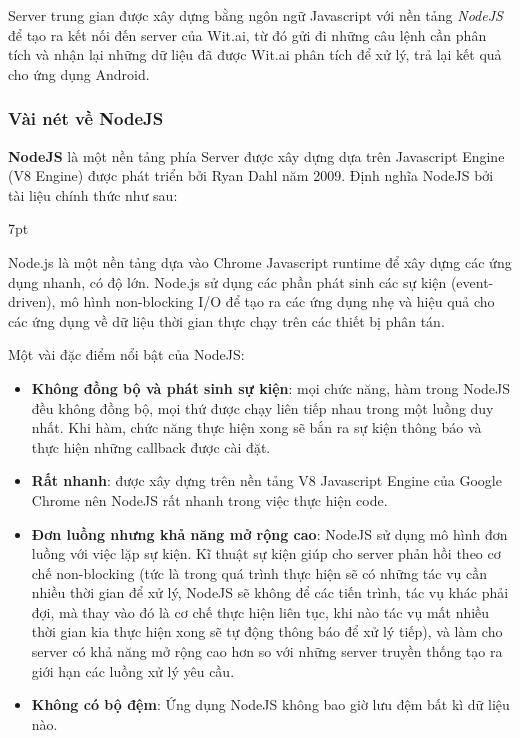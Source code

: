 \documentclass[12pt]{report}
\newenvironment{formal}{%
  \def\FrameCommand{%
    \hspace{1pt}%
    {\color{mygray}\vrule width 6pt}%
    {\color{lightgray}\vrule width 4pt}%
    \colorbox{lightgray}%
  }%
  \MakeFramed{\advance\hsize-\width\FrameRestore}%
  \noindent\hspace{-4.55pt}%
  \begin{adjustwidth}{}{7pt}%
  \vspace{2pt}\vspace{2pt}%
}
{%
  \vspace{2pt}\end{adjustwidth}\endMakeFramed%
}
\begin{document}
Server trung gian được xây dựng bằng ngôn ngữ Javascript với nền tảng \textit{NodeJS} để tạo ra kết nối đến server của Wit.ai, từ đó gửi đi những câu lệnh cần phân tích và nhận lại những dữ liệu đã được Wit.ai phân tích để xử lý, trả lại kết quả cho ứng dụng Android.

\subsubsection{Vài nét về NodeJS}

\textbf{NodeJS} là một nền tảng phía Server được xây dựng dựa trên Javascript Engine (V8 Engine) được phát triển bởi Ryan Dahl năm 2009. Định nghĩa NodeJS bởi tài liệu chính thức như sau:

\begin{formal}
Node.js là một nền tảng dựa vào Chrome Javascript runtime để xây dựng các ứng dụng nhanh, có độ lớn. Node.js sử dụng các phần phát sinh các sự kiện (event-driven), mô hình non-blocking I/O để tạo ra các ứng dụng nhẹ và hiệu quả cho các ứng dụng về dữ liệu thời gian thực chạy trên các thiết bị phân tán.
\end{formal}

Một vài đặc điểm nổi bật của NodeJS:

\begin{itemize}
	\item \textbf{Không đồng bộ và phát sinh sự kiện}: mọi chức năng, hàm trong NodeJS đều không đồng bộ, mọi thứ được chạy liên tiếp nhau trong một luồng duy nhất. Khi hàm, chức năng thực hiện xong sẽ bắn ra sự kiện thông báo và thực hiện những callback được cài đặt.
	\item \textbf{Rất nhanh}: được xây dựng trên nền tảng V8 Javascript Engine của Google Chrome nên NodeJS rất nhanh trong việc thực hiện code.
	\item \textbf{Đơn luồng nhưng khả năng mở rộng cao}: NodeJS sử dụng mô hình đơn luồng với việc lặp sự kiện. Kĩ thuật sự kiện giúp cho server phản hồi theo cơ chế non-blocking (tức là trong quá trình thực hiện sẽ có những tác vụ cần nhiều thời gian để xử lý, NodeJS sẽ không để các tiến trình, tác vụ khác phải đợi, mà thay vào đó là cơ chế thực hiện liên tục, khi nào tác vụ mất nhiều thời gian kia thực hiện xong sẽ tự động thông báo để xử lý tiếp), và làm cho server có khả năng mở rộng cao hơn so với những server truyền thống tạo ra giới hạn các luồng xử lý yêu cầu.
	\item \textbf{Không có bộ đệm}: Ứng dụng NodeJS không bao giờ lưu đệm bất kì dữ liệu nào.
\end{itemize}
\end{document}
